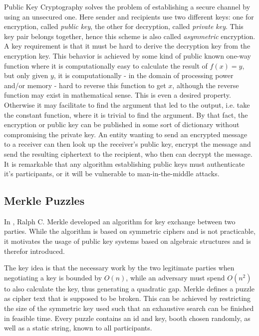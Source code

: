 Public Key Cryptography solves the problem of establishing a secure channel by using an unsecured one.
Here sender and recipients use two different keys: one for encryption, called \textit{public key}, the other
for decryption, called \textit{private key}. This key pair belongs together, hence this scheme is also called \textit{asymmetric} encryption. A key requirement
is that it must be hard
to derive the decryption key from the encryption key. This behavior is achieved by some kind of public known one-way function where it is computationally
easy to calculate the result of $f(x) = y$, but only given $y$, it is computationally - in the domain of processing power and/or memory - hard
to reverse this function to get $x$, although the reverse function may exist in mathematical sense. This is even a desired property. Otherwise
it may facilitate to find the argument that led to the output, i.e. take the constant function, where it is trivial to find the argument.
By that fact, the encryption or public key can be published in some sort of dictionary without compromising the private key. An entity wanting to
send an encrypted message to a receiver can then look up the receiver's public key, encrypt the message and send the resulting
ciphertext to the recipient, who then can decrypt the message. It is remarkable that any algorithm establishing public keys must authenticate it's 
participants, or it will be vulnerable to man-in-the-middle attacks.

\subsection{Merkle Puzzles}

In \cite{Merkle}, Ralph C. Merkle developed an algorithm for key exchange between two parties. While the algorithm is based on symmetric ciphers and is
not practicable, it motivates the usage of public key systems based on algebraic structures and is therefor introduced.

The key idea is that the necessary work by the two legitimate parties when negotiating a key is bounded by $O(n)$, while an adversary must spend $O(n^2)$ to 
also calculate the key, thus generating a quadratic gap. 
Merkle defines a puzzle as cipher text that is supposed to be broken. This can be achieved by restricting the size of the symmetric key used such that an
exhaustive search can be finished in feasible time. Every puzzle contains an id and key, booth chosen randomly, as well as a static string,
known to all participants.

